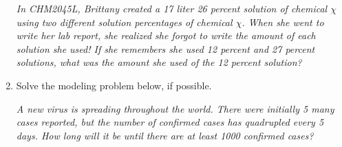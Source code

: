 \documentclass[14pt]{extbook}
\begin{document}
\begin{enumerate}
{\begin{center}
    \textit{ In CHM2045L, Brittany created a 17 liter 26 percent solution of chemical $\chi$ using two different solution percentages of chemical $\chi$. When she went to write her lab report, she realized she forgot to write the amount of each solution she used! If she remembers she used 12 percent and 27 percent solutions, what was the amount she used of the 12 percent solution? }
\end{center}
} \newpage
\item{
Solve the modeling problem below, if possible.
\begin{center}
    \textit{ A new virus is spreading throughout the world. There were initially 5 many cases reported, but the number of confirmed cases has quadrupled every 5 days. How long will it be until there are at least 1000 confirmed cases? }
\end{center}
} \newpage
\end{enumerate}
\end{document}
